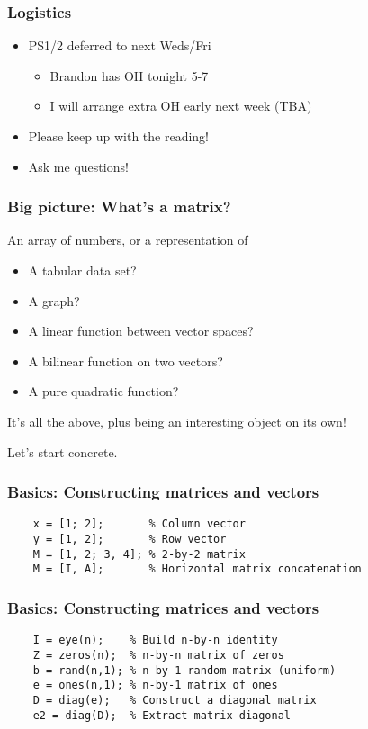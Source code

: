 \documentclass{beamer}
\begin{document}
\begin{frame}
  \titlepage
\end{frame}

\begin{frame}
  \frametitle{Logistics}

  \begin{itemize}
  \item PS1/2 deferred to next Weds/Fri
    \begin{itemize}
    \item Brandon has OH tonight 5-7
    \item I will arrange extra OH early next week (TBA)
    \end{itemize}
  \item Please keep up with the reading!
  \item Ask me questions!
  \end{itemize}
\end{frame}

\begin{frame}
  \frametitle{Big picture: What's a matrix?}

  An array of numbers, or a representation of
  \begin{itemize}
  \item A tabular data set?
  \item A graph?
  \item A linear function between vector spaces?
  \item A bilinear function on two vectors?
  \item A pure quadratic function?
  \end{itemize}
  It's all the above, plus being an interesting object on its own!

  \vspace{5mm}
  Let's start concrete.
  
\end{frame}

\begin{frame}[fragile]
  \frametitle{Basics: Constructing matrices and vectors}

  \begin{lstlisting}
    x = [1; 2];       % Column vector
    y = [1, 2];       % Row vector
    M = [1, 2; 3, 4]; % 2-by-2 matrix
    M = [I, A];       % Horizontal matrix concatenation
  \end{lstlisting}
\end{frame}

\begin{frame}[fragile]
  \frametitle{Basics: Constructing matrices and vectors}

  \begin{lstlisting}
    I = eye(n);    % Build n-by-n identity
    Z = zeros(n);  % n-by-n matrix of zeros
    b = rand(n,1); % n-by-1 random matrix (uniform)
    e = ones(n,1); % n-by-1 matrix of ones
    D = diag(e);   % Construct a diagonal matrix
    e2 = diag(D);  % Extract matrix diagonal
  \end{lstlisting}
\end{frame}
\end{document}
